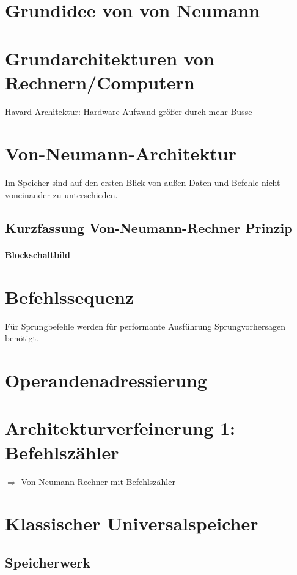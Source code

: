 \section{Grundidee von von Neumann}
\section{Grundarchitekturen von Rechnern/Computern}
Havard-Architektur: Hardware-Aufwand größer durch mehr Busse

\section{Von-Neumann-Architektur}
Im Speicher sind auf den ersten Blick von außen Daten und Befehle nicht voneinander zu unterschieden.

\subsection{Kurzfassung Von-Neumann-Rechner Prinzip}
\paragraph{Blockschaltbild}

\section{Befehlssequenz}
Für Sprungbefehle werden für performante Ausführung Sprungvorhersagen benötigt.

\section{Operandenadressierung}

\section{Architekturverfeinerung 1: Befehlszähler}
$\Rightarrow$ Von-Neumann Rechner mit Befehlszähler

\section{Klassischer Universalspeicher}
\subsection{Speicherwerk}
